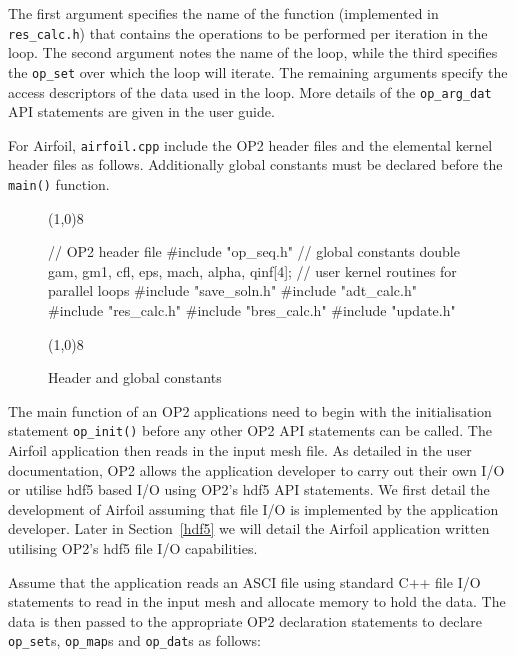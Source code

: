 \documentclass[11pt]{article}
\begin{document}
\noindent The first argument specifies the name of the function (implemented in \texttt{res\_calc.h}) that contains the
operations to be performed per iteration in the loop. The second argument notes the name of the loop, while the third
specifies the \texttt{op\_set} over which the loop will iterate. The remaining arguments specify the access descriptors
of the data used in the loop. More details of the \texttt{op\_arg\_dat} API statements are given in the user guide.

For Airfoil, \texttt{airfoil.cpp} include the OP2 header files and the elemental kernel header files as follows.
Additionally global constants must be declared before the \texttt{main()} function.

\begin{figure}\small
\vspace{-0pt}\noindent\line(1,0){8}\vspace{-20pt}
\begin{pyglist}[language=c]
// OP2 header file
#include "op_seq.h"
// global constants
double gam, gm1, cfl, eps, mach, alpha, qinf[4];
// user kernel routines for parallel loops
#include "save_soln.h"
#include "adt_calc.h"
#include "res_calc.h"
#include "bres_calc.h"
#include "update.h"
\end{pyglist}
\vspace{-10pt}\noindent\line(1,0){8}\vspace{-10pt}
\caption{\small Header and global constants }
\normalsize\vspace{-10pt}\label{fig:header}
\end{figure}

\noindent The main function of an OP2 applications need to begin with the initialisation statement \texttt{op\_init()}
before any other OP2 API statements can be called. The Airfoil application then reads in the input mesh file. As
detailed in the user documentation, OP2 allows the application developer to carry out their own I/O or utilise hdf5
based I/O using OP2's hdf5 API statements. We first detail the development of Airfoil assuming that file I/O is
implemented by the application developer. Later in Section~\ref{hdf5} we will detail the Airfoil application written
utilising OP2's hdf5 file I/O capabilities. 

Assume that the application reads an ASCI file using standard C++ file I/O statements to read in the input mesh and
allocate memory to hold the data. The data is then passed to the appropriate OP2 declaration statements to declare
\texttt{op\_set}s, \texttt{op\_map}s and \texttt{op\_dat}s as follows:
\end{document}
